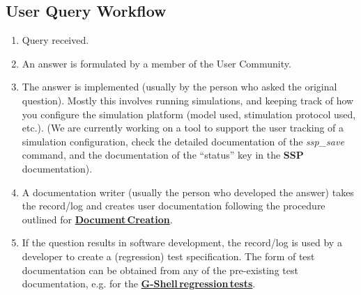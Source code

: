 \documentclass[12pt]{article}
\begin{document}
\subsection*{User Query Workflow}

\begin{enumerate}
\item Query received.
\item An answer is formulated by a member of the User Community.
\item The answer is implemented (usually by the person who asked the
  original question).  Mostly this involves running simulations, and
  keeping track of how you configure the simulation platform (model used, stimulation protocol used, etc.).  (We are currently working
  on a tool to support the user tracking of a simulation
  configuration, check the detailed documentation of the {\it ssp\_save}
  command, and the documentation of the ``status'' key in the {\bf SSP}
  documentation).
\item A documentation writer (usually the person who developed the
  answer) takes the record/log and creates user documentation
  following the procedure outlined for
  \href{../document-create/document-create.tex}{\bf Document\,Creation}.
\item If the question results in software development, the record/log
  is used by a developer to create a (regression) test specification.
  The form of test documentation can be obtained from any of the
  pre-existing test documentation, e.g. for the
  \href{../tests-gshell/tests-gshell.tex}{\bf G-Shell\,regression\,tests}.
\end{enumerate}
\end{document}
